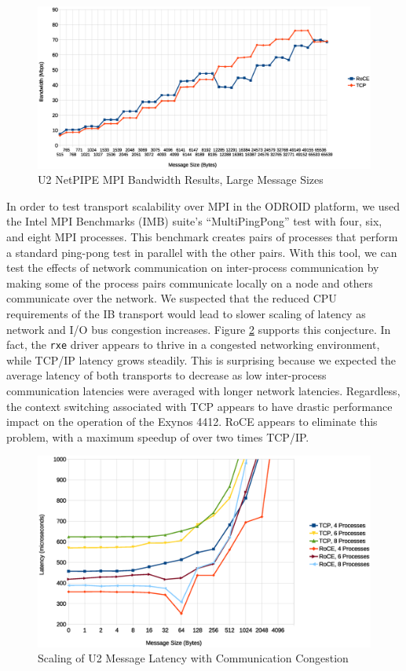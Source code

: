 \documentclass[11pt]{book}
\begin{document}
\begin{figure}
\includegraphics[width=\textwidth]{netpipe_bw_large}
\caption{U2 NetPIPE MPI Bandwidth Results, Large Message Sizes}\label{npmpi-hbw}
\end{figure}

In order to test transport scalability over MPI in the ODROID platform, we used the Intel
MPI Benchmarks (IMB) suite's ``MultiPingPong'' test with four, six, and eight MPI
processes.  This benchmark creates pairs of processes that perform a standard ping-pong
test in parallel with the other pairs. With this tool, we can test the effects of network
communication on inter-process communication by making some of the process pairs
communicate locally on a node and others communicate over the network.  We suspected that
the reduced CPU requirements of the IB transport would lead to slower scaling of latency
as network and I/O bus congestion increases.  Figure \ref{multipingpong-u2} supports this
conjecture.  In fact, the \verb;rxe; driver appears to thrive in a congested networking
environment, while TCP/IP latency grows steadily.  This is surprising because we expected
the average latency of both transports to decrease as low inter-process communication
latencies were averaged with longer network latencies.  Regardless, the context switching
associated with TCP appears to have drastic performance impact on the operation of the
Exynos 4412.  RoCE appears to eliminate this problem, with a maximum speedup of over two
times TCP/IP.

\begin{figure}
\includegraphics[width=\textwidth]{pingpong_multi_zoom}
\caption{Scaling of U2 Message Latency with Communication Congestion}
\label{multipingpong-u2}
\end{figure}
\end{document}
